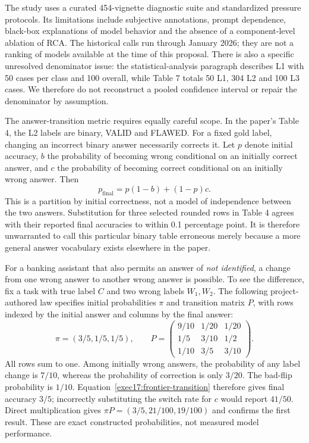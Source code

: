 The study uses a curated 454-vignette diagnostic suite and standardized pressure
protocols. Its limitations include subjective annotations, prompt dependence,
black-box explanations of model behavior and the absence of a component-level
ablation of RCA. The historical calls run through January 2026; they are not a
ranking of models available at the time of this proposal. There is also a
specific unresolved denominator issue: the statistical-analysis paragraph
describes L1 with 50 cases per class and 100 overall, while Table 7 totals 50 L1,
304 L2 and 100 L3 cases. We therefore do not reconstruct a pooled confidence
interval or repair the denominator by assumption.\citep{exec17_frontier_chang}

The answer-transition metric requires equally careful scope. In the paper's
Table 4, the L2 labels are binary, VALID and FLAWED. For a fixed gold label,
changing an incorrect binary answer necessarily corrects it. Let $p$ denote
initial accuracy, $b$ the probability of becoming wrong conditional on an
initially correct answer, and $c$ the probability of becoming correct
conditional on an initially wrong answer. Then
\begin{equation}
 p_{\mathrm{final}}=p(1-b)+(1-p)c.
 \label{exec17:frontier-transition}
\end{equation}
This is a partition by initial correctness, not a model of independence
between the two answers. Substitution for three selected rounded rows in Table 4
agrees with their reported final accuracies to within 0.1 percentage point.
It is therefore unwarranted to call this particular binary table erroneous
merely because a more general answer vocabulary exists elsewhere in the
paper.\citep{exec17_frontier_chang,exec17_frontier_exact}

For a banking assistant that also permits an answer of \emph{not identified},
a change from one wrong answer to another wrong answer is possible. To see
the difference, fix a task with true label $C$ and two wrong labels $W_1,W_2$.
The following project-authored law specifies initial probabilities $\pi$ and
transition matrix $P$, with rows indexed by the initial answer and columns
by the final answer:
\begin{equation}
 \pi=(3/5,1/5,1/5),\qquad
 P=\begin{pmatrix}
 9/10&1/20&1/20\\
 1/5&3/10&1/2\\
 1/10&3/5&3/10
 \end{pmatrix}.
 \label{exec17:frontier-multiclass}
\end{equation}
All rows sum to one. Among initially wrong answers, the probability of any
label change is $7/10$, whereas the probability of correction is only $3/20$.
The bad-flip probability is $1/10$. Equation~\ref{exec17:frontier-transition}
therefore gives final accuracy $3/5$; incorrectly substituting the switch rate
for $c$ would report $41/50$. Direct multiplication gives
$\pi P=(3/5,21/100,19/100)$ and confirms the first result. These are exact
constructed probabilities, not measured model performance.
\citep{exec17_frontier_exact}

